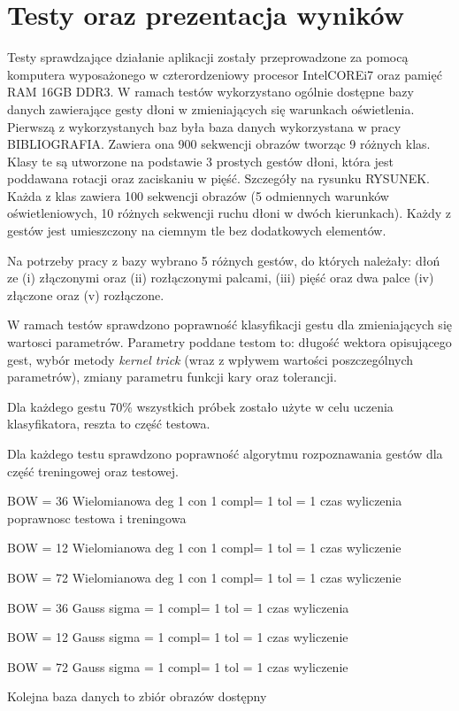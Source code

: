 \chapter{Testy oraz prezentacja wyników}
\label{cha: Tests}
Testy sprawdzające działanie aplikacji zostały przeprowadzone za pomocą komputera wyposażonego w czterordzeniowy procesor Intel\textregistered CORE\texttrademark i7 oraz pamięć RAM 16GB DDR3. W ramach testów wykorzystano ogólnie dostępne bazy danych zawierające gesty dłoni w zmieniających się warunkach oświetlenia. 
Pierwszą z wykorzystanych baz była baza danych wykorzystana w pracy BIBLIOGRAFIA. Zawiera ona 900 sekwencji obrazów tworząc 9 różnych klas. Klasy te są utworzone na podstawie 3 prostych gestów dłoni, która jest poddawana rotacji oraz zaciskaniu w pięść. Szczegóły na rysunku RYSUNEK. Każda z klas zawiera 100 sekwencji obrazów (5 odmiennych warunków oświetleniowych, 10 różnych sekwencji ruchu dłoni w dwóch kierunkach). Każdy z gestów jest umieszczony na ciemnym tle bez dodatkowych elementów. 

Na potrzeby pracy z bazy wybrano 5 różnych gestów, do których należały: dłoń ze (i) złączonymi oraz (ii) rozłączonymi palcami, (iii) pięść oraz dwa palce (iv) złączone oraz (v) rozłączone. 

W ramach testów sprawdzono poprawność klasyfikacji gestu dla zmieniających się wartosci parametrów. Parametry poddane testom to: długość wektora opisującego gest, wybór metody \textit{kernel trick} (wraz z wpływem wartości poszczególnych parametrów), zmiany parametru funkcji kary oraz tolerancji.

Dla każdego gestu 70\% wszystkich próbek zostało użyte w celu uczenia klasyfikatora, reszta to część testowa. 

Dla każdego testu sprawdzono poprawność algorytmu rozpoznawania gestów dla część treningowej oraz testowej.  


BOW = 36 Wielomianowa deg 1 con 1 compl= 1 tol = 1 czas wyliczenia poprawnosc testowa i treningowa

BOW = 12 Wielomianowa deg 1 con 1 compl= 1 tol = 1 czas wyliczenie

BOW = 72 Wielomianowa deg 1 con 1 compl= 1 tol = 1 czas wyliczenie

BOW = 36 Gauss sigma = 1 compl= 1 tol = 1 czas wyliczenia

BOW = 12 Gauss sigma = 1 compl= 1 tol = 1 czas wyliczenie

BOW = 72 Gauss sigma = 1 compl= 1 tol = 1 czas wyliczenie

Kolejna baza danych to zbiór obrazów dostępny 

